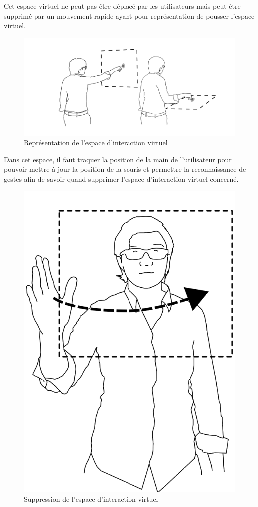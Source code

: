 Cet espace virtuel ne peut pas être déplacé par les utilisateurs mais peut être supprimé par un mouvement rapide ayant pour représentation de pousser l’espace virtuel.

\begin{figure}[!ht]
	\center	
	\includegraphics[scale=0.3]{image/touch.png}
	\caption{Représentation de l'espace d'interaction virtuel}
\end{figure}

Dans cet espace, il faut traquer la position de la main de l’utilisateur pour pouvoir mettre à jour la position de la souris et permettre la reconnaissance de gestes afin de savoir quand supprimer l’espace d’interaction virtuel concerné.

\begin{figure}[!ht]
	\center	
	\includegraphics[scale=0.2]{image/remove.png}
	\caption{Suppression de l'espace d'interaction virtuel}
\end{figure}
	
